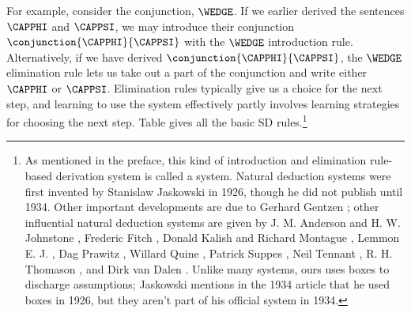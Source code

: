 For example, consider the conjunction, $\WEDGE$. If we earlier derived the sentences $\CAPPHI$ and $\CAPPSI$, we may introduce their conjunction $\conjunction{\CAPPHI}{\CAPPSI}$ with the $\WEDGE$ introduction rule. 
Alternatively, if we have derived $\conjunction{\CAPPHI}{\CAPPSI}$, the $\WEDGE$ elimination rule lets us take out a part of the conjunction and write either $\CAPPHI$ or $\CAPPSI$.
Elimination rules typically give us a choice for the next step, and learning to use the system effectively partly involves learning strategies for choosing the next step.
Table  gives all the basic SD rules.\footnote{As mentioned in the preface, this kind of introduction and elimination rule-based derivation system is called a  system.
Natural deduction systems were first invented by Stanislaw Jaskowski in 1926, though he did not publish until 1934.  Other important developments are due to Gerhard Gentzen \citeyearpar{Gentzen1934}; other influential natural deduction systems are given by J. M. Anderson and H. W. Johnstone \citeyearpar{Anderson1962}, Frederic Fitch \citeyearpar{Fitch1952}, Donald Kalish and Richard Montague \citeyearpar{Kalish1964}, Lemmon E. J. \citeyearpar{Lemmon1965}, Dag Prawitz \citeyearpar{Prawitz1965}, Willard Quine \citeyearpar{Quine1950}, Patrick Suppes \citeyearpar{Suppes1957}, Neil Tennant \citeyearpar{Tennant1978}, R. H. Thomason \citeyearpar{Thomason1970}, and Dirk van Dalen \citeyearpar{Dalen1980} \citep[28]{Hodges2001}.  Unlike many systems, ours uses boxes to discharge assumptions; Jaskowski mentions in the 1934 article that he used boxes in 1926, but they aren't part of his official system in 1934.}
\renewcommand{\arraystretch}{1.5}
